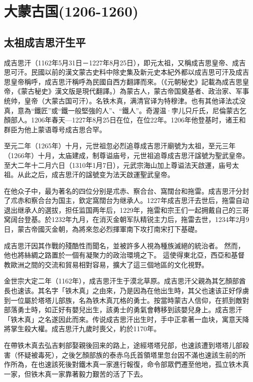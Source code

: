 
\section{大蒙古国\tiny(1206-1260)}

\subsection{太祖成吉思汗生平}

成吉思汗（1162年5月31日－1227年8月25日），即元太祖，又稱成吉思皇帝、成吉思可汗。民國以前的漢文蒙古史料中除史集及新元史本紀外都以成吉思可汗及成吉思皇帝稱呼，成吉思汗稱呼為民國自西方翻譯而來。（《元朝秘史》記載為成吉思皇帝，《蒙古秘史》漢文版是現代翻譯。）為蒙古人，蒙古帝国奠基者、政治家、军事统帅，皇帝（大蒙古国可汗）。名铁木真，满清官译为特穆津。也有其他译法忒没真，意為“鐵匠”或“鐵一般堅強的人”、“鐵人”。奇渥温·孛儿只斤氏，尼倫蒙古乞顏部人。1206年春天—1227年8月25日在位，在位22年。1206年他登基时，诸王和群臣为他上蒙语尊号成吉思合罕。

至元二年（1265年）十月，元世祖忽必烈追尊成吉思汗廟號为太祖，至元三年（1266年）十月，太庙建成，制尊谥庙号，元世祖追尊成吉思汗諡號为聖武皇帝。至大二年十二月六日（1310年1月7日），元武宗海山加上尊谥法天啟運，庙号太祖。从此之后，成吉思汗的諡號变为法天啟運聖武皇帝。 

在他众子中，最为著名的四位分别是朮赤、察合台、窩闊台和拖雷。成吉思汗分封了朮赤和察合台为国主，欽定窩闊台为继承人。1227年成吉思汗去世后，拖雷自动退出继承人的選拔，担任监国两年后，1229年，拖雷和宗王们一起拥戴自己的三哥窝阔台登基。於1232年九月，在消灭金朝军队精锐主力后，拖雷去世，1234年2月9日，蒙古帝國灭金朝，為將來忽必烈揮軍南下攻打南宋打下基礎。

成吉思汗因其作戰的殘酷性而聞名，並被許多人視為種族滅絕的統治者。 然而，他也將絲綢之路置於一個有凝聚力的政治環境之下。 這使得東北亞，西亞和基督教歐洲之間的交流和貿易相對容易，擴大了這三個地區的文化視野。

金世宗大定二年（1162年），成吉思汗生于漠北草原。成吉思汗父親為其乞顏部酋長也速该。其名字「铁木真」之由來，乃是因為在他出生時，其父也速该正好俘虜到一位屬於塔塔儿部族，名為铁木真兀格的勇士。按當時蒙古人信仰，在抓到敵對部落勇士時，如正好有嬰兒出生，該勇士的勇氣會轉移到該嬰兒身上。成吉思汗「铁木真」之名遂因此而來。传说成吉思汗出生时，手中正拿著一血块，寓意天降將掌生殺大權。成吉思汗九歲时喪父，約於1170年。

在帶铁木真去弘吉剌部娶親後回来的路上，途經塔塔兒部，也速該遭到塔塔儿部殺害（怀疑被毒死），之後乞顏部族的泰赤乌氏首領塔里忽台因不滿也速該生前的所作所為，在也速該死後對鐵木真一家進行報復，命令部眾們遷至他地，孤立铁木真一家，但铁木真一家靠著毅力艱苦的活了下去。

